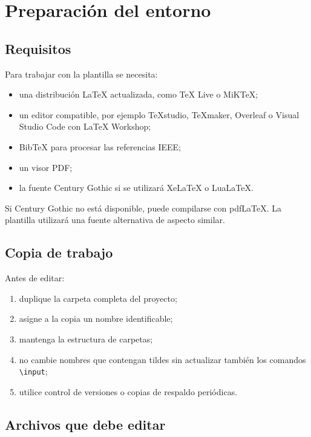 \documentclass[12pt,a4paper,oneside]{report}
\begin{document}
\tableofcontents
\clearpage
{}

\chapter{Preparación del entorno}

\section{Requisitos}

Para trabajar con la plantilla se necesita:

\begin{itemize}
  \item una distribución LaTeX actualizada, como TeX Live o MiKTeX;
  \item un editor compatible, por ejemplo TeXstudio, TeXmaker, Overleaf o Visual Studio Code con LaTeX Workshop;
  \item BibTeX para procesar las referencias IEEE;
  \item un visor PDF;
  \item la fuente Century Gothic si se utilizará XeLaTeX o LuaLaTeX.
\end{itemize}

Si Century Gothic no está disponible, puede compilarse con pdfLaTeX. La plantilla utilizará una fuente alternativa de aspecto similar.

\section{Copia de trabajo}

Antes de editar:

\begin{enumerate}
  \item duplique la carpeta completa del proyecto;
  \item asigne a la copia un nombre identificable;
  \item mantenga la estructura de carpetas;
  \item no cambie nombres que contengan tildes sin actualizar también los comandos \texttt{\textbackslash input};
  \item utilice control de versiones o copias de respaldo periódicas.
\end{enumerate}

\section{Archivos que debe editar}
\end{document}

